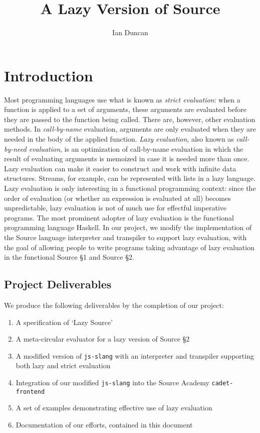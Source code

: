 \documentclass[12pt,a4paper]{report}
\author{Ian Duncan}
\title{A Lazy Version of Source}
\begin{document}
\maketitle
\newpage
\tableofcontents
\newpage
\chapter{Introduction}
Most programming languages use what is known as \textit{strict evaluation}: when a function is applied to a set of arguments, these arguments are evaluated before they are passed to the function being called. There are, however, other evaluation methods. In \textit{call-by-name} evaluation, arguments are only evaluated when they are needed in the body of the applied function. \textit{Lazy evaluation}, also known as \textit{call-by-need evaluation}, is an optimization of call-by-name evaluation in which the result of evaluating arguments is memoized in case it is needed more than once. Lazy evaluation can make it easier to construct and work with infinite data structures. Streams, for example, can be represented with lists in a lazy language. Lazy evaluation is only interesting in a functional programming context: since the order of evaluation (or whether an expression is evaluated at all) becomes unpredictable, lazy evaluation is not of much use for effectful imperative programs. The most prominent adopter of lazy evaluation is the functional programming language Haskell. In our project, we modify the implementation of the Source language interpreter and transpiler to support lazy evaluation, with the goal of allowing people to write programs taking advantage of lazy evaluation in the functional Source \S1 and Source \S2.

\section{Project Deliverables}
We produce the following deliverables by the completion of our project:
\begin{enumerate}
\item A specification of `Lazy Source'
\item A meta-circular evaluator for a lazy version of Source \S2
\item A modified version of \texttt{js-slang} with an interpreter and transpiler supporting both lazy and strict evaluation
\item Integration of our modified \texttt{js-slang} into the Source Academy \texttt{cadet-frontend}
\item A set of examples demonstrating effective use of lazy evaluation
\item Documentation of our efforts, contained in this document
\end{enumerate}
\end{document}
